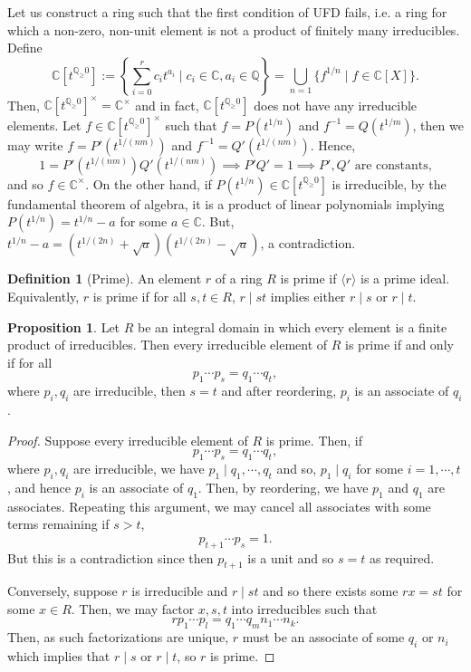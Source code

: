 \documentclass[]{article}
\theoremstyle{definition}
\theoremstyle{definition}
\newtheorem{definition}{Definition}[section]
\newtheorem{proposition}{Proposition}[section]
\begin{document}
Let us construct a ring such that the first 
condition of UFD fails, i.e. a ring for which a non-zero, non-unit element is 
not a product of finitely many irreducibles. Define 
\[\mathbb{C}[t^{\mathbb{Q}_\ge 0}] := 
  \left\{\sum_{i = 0}^r c_i t^{a_i} \mid c_i \in \mathbb{C}, a_i \in \mathbb{Q} 
  \right\} = \bigcup_{n = 1} \{f^{1/n} \mid f \in \mathbb{C}[X]\}.\]
Then, \(\mathbb{C}[t^{\mathbb{Q}_\ge 0}]^\times = \mathbb{C}^\times\) and 
in fact, \(\mathbb{C}[t^{\mathbb{Q}_\ge 0}]\) does not have any irreducible 
elements. Let \(f \in \mathbb{C}[t^{\mathbb{Q}_\ge 0}]^\times\) such that 
\(f = P(t^{1/n})\) and \(f^{-1} = Q(t^{1/m})\), then we may write 
\(f = P'(t^{1/(nm)})\) and \(f^{-1} = Q'(t^{1/(nm)})\). Hence, 
\[1 = P'(t^{1/(nm)}) Q'(t^{1/(nm)}) \implies P'Q' = 1 \implies P', Q' 
\text{ are constants,}\]
and so \(f \in \mathbb{C}^\times\). On the other hand, if 
\(P(t^{1 / n}) \in \mathbb{C}[t^{\mathbb{Q}_\ge 0}]\) is irreducible, by the 
fundamental theorem of algebra, it is a product of linear polynomials implying 
\(P(t^{1 / n}) = t^{1 / n} - a\) for some \(a \in \mathbb{C}\). But, 
\(t^{1 / n} - a = (t^{1 / (2n)} + \sqrt{a})(t^{1 / (2n)} - \sqrt{a})\), a 
contradiction.

\begin{definition}[Prime]
  An element \(r\) of a ring \(R\) is prime if \(\langle r \rangle\) is a prime 
  ideal. Equivalently, \(r\) is prime if for all \(s, t \in R\), \(r \mid st\) 
  implies either \(r \mid s\) or \(r \mid t\).
\end{definition}

\begin{proposition}\label{ufdiff}
  Let \(R\) be an integral domain in which every element is a finite product of 
  irreducibles. Then every irreducible element of \(R\) is prime if 
  and only if for all 
  \[p_1 \cdots p_s = q_1 \cdots q_t,\]
  where \(p_i, q_i\) are irreducible, then \(s = t\) and after reordering, 
  \(p_i\) is an associate of \(q_i\).
\end{proposition}
\begin{proof}
  Suppose every irreducible element of \(R\) is prime. Then, if 
  \[p_1 \cdots p_s = q_1 \cdots q_t,\]
  where \(p_i, q_i\) are irreducible, we have 
  \(p_1 \mid q_1,\cdots, q_t\) and so, \(p_1 \mid q_i\) for some 
  \(i = 1, \cdots, t\), and hence \(p_i\) is an associate of \(q_1\). Then, 
  by reordering, we have \(p_1\) and \(q_1\) are associates. Repeating this 
  argument, we may cancel all associates with some terms remaining if \(s > t\),
  \[p_{t + 1} \cdots p_s = 1.\]
  But this is a contradiction since then \(p_{t + 1}\) is a unit and so 
  \(s = t\) as required.  

  Conversely, suppose \(r\) is irreducible and \(r \mid st\) and so there exists 
  some \(rx = st\) for some \(x \in R\). Then, we may factor \(x, s, t\) into 
  irreducibles such that 
  \[r p_1 \cdots p_l = q_1 \cdots q_m n_1 \cdots n_k.\]
  Then, as such factorizations are unique, \(r\) must be an associate of some 
  \(q_i\) or \(n_i\) which implies that \(r \mid s\) or \(r \mid t\), 
  so \(r\) is prime.
\end{proof}
\end{document}
